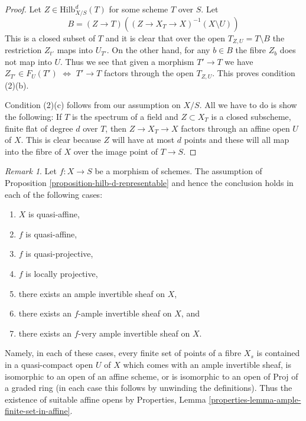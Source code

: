 \documentclass{stacks-project}
\theoremstyle{plain}
\theoremstyle{definition}
\theoremstyle{remark}
\newtheorem{remark}[subsection]{Remark}
\numberwithin{equation}{subsection}
\def\Hilbfunctor{\mathrm{Hilb}}
\begin{document}
\begin{proof}
\medskip\noindent
Let $Z \in \Hilbfunctor^d_{X/S}(T)$ for some scheme $T$ over $S$. Let
$$
B = (Z \to T)\left((Z \to X_T \to X)^{-1}(X \setminus U)\right)
$$
This is a closed subset of $T$ and it is clear that over the open
$T_{Z, U} = T \setminus B$ the restriction $Z_{t'}$ maps into $U_{T'}$.
On the other hand, for any $b \in B$ the fibre $Z_b$ does not map
into $U$. Thus we see that given a morphism $T' \to T$ we
have $Z_{T'} \in F_U(T')$ $\Leftrightarrow$ $T' \to T$ factors through
the open $T_{Z, U}$. This proves condition (2)(b).

\medskip\noindent
Condition (2)(c) follows from our assumption on $X/S$. All we have
to do is show the following: If $T$ is the spectrum of a field
and $Z \subset X_T$ is a closed subscheme, finite flat of degree
$d$ over $T$, then $Z \to X_T \to X$ factors through an affine open
$U$ of $X$. This is clear because $Z$ will have at most $d$ points
and these will all map into the fibre of $X$ over the image point
of $T \to S$.
\end{proof}

\begin{remark}
\label{remark-when-proposition-applies}
Let $f : X \to S$ be a morphism of schemes. The assumption of
Proposition \ref{proposition-hilb-d-representable} and
hence the conclusion holds in each of the following cases:
\begin{enumerate}
\item $X$ is quasi-affine,
\item $f$ is quasi-affine,
\item $f$ is quasi-projective,
\item $f$ is locally projective,
\item there exists an ample invertible sheaf on $X$,
\item there exists an $f$-ample invertible sheaf on $X$, and
\item there exists an $f$-very ample invertible sheaf on $X$.
\end{enumerate}
Namely, in each of these cases, every finite set of points of
a fibre $X_s$ is contained in a quasi-compact open $U$ of $X$
which comes with an ample invertible sheaf, is isomorphic
to an open of an affine scheme, or is isomorphic to an open
of $\text{Proj}$ of a graded ring (in each case this follows
by unwinding the definitions). Thus the existence of suitable
affine opens by
Properties, Lemma \ref{properties-lemma-ample-finite-set-in-affine}.
\end{remark}
\end{document}
